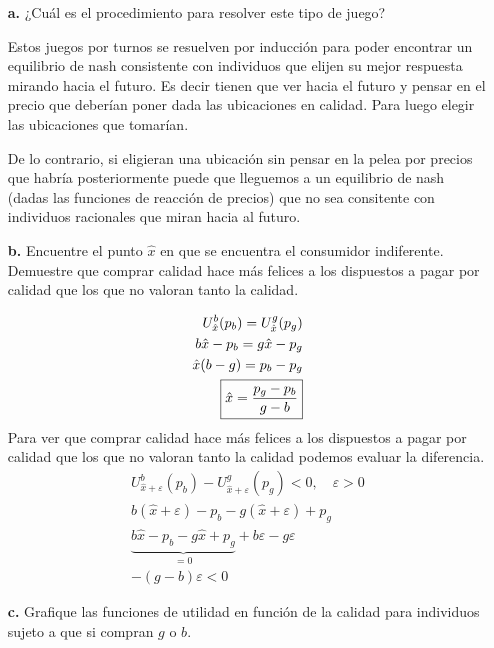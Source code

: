 \documentclass{exam}
\begin{document}
\begin{itemize}
    \item[\textbf{a.}] ¿Cuál es el procedimiento para resolver este tipo de juego?
    \begin{solution}
        Estos juegos por turnos se resuelven por inducción para poder encontrar un equilibrio de nash consistente con individuos que elijen su mejor respuesta mirando hacia el futuro. Es decir tienen que ver hacia el futuro y pensar en el precio que deberían poner dada las ubicaciones en calidad. Para luego elegir las ubicaciones que tomarían. 

        De lo contrario, si eligieran una ubicación sin pensar en la pelea por precios que habría posteriormente puede que lleguemos a un equilibrio de nash (dadas las funciones de reacción de precios) que no sea consitente con individuos racionales que miran hacia al futuro. 
    \end{solution}
    \item[\textbf{b.}] Encuentre el punto $\hat{x}$ en que se encuentra el consumidor indiferente. Demuestre que comprar calidad hace más felices a los dispuestos a pagar por calidad que los que no valoran tanto la calidad.
    \begin{solution}
        \begin{align}
            U_{\hat{x}}^b(p_b) = U_{\hat{x}}^g(p_g) \notag \\
            b\hat{x} - p_b =  g\hat{x} - p_g \notag \\
            \hat{x} (b-g) = p_b-p_g \notag \\
            \boxed{\hat{x} = \frac{p_g-p_b}{g-b}} \label{ind indife}
        \end{align}
        Para ver que comprar calidad hace más felices a los dispuestos a pagar por calidad que los que no valoran tanto la calidad podemos evaluar la diferencia. 
        \begin{align*}
            U_{\hat{x} + \varepsilon}^{b}(p_b) - U_{\hat{x} + \varepsilon}^{g}(p_g) < 0 , \quad \varepsilon > 0 \\
            b(\hat{x} + \varepsilon) - p_b - g(\hat{x} + \varepsilon) + p_g \\
            \underbrace{b\hat{x} - p_b -  g\hat{x} + p_g }_{= 0} + b\varepsilon - g\varepsilon \\
            \boxed{-(g-b)\varepsilon < 0 }
        \end{align*}
    \end{solution}
    \item[\textbf{c.}] Grafique las funciones de utilidad en función de la calidad para individuos sujeto a que si compran $g$ o $b$. 

\end{itemize}
\end{document}
